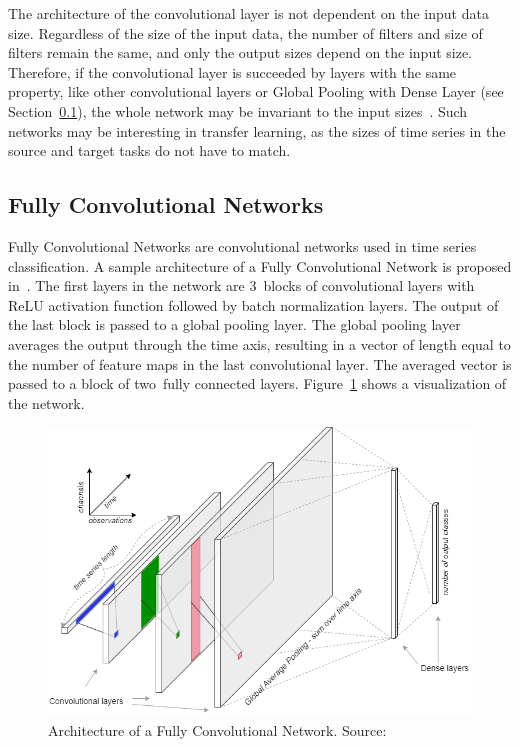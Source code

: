 \documentclass[a4paper,11pt,twoside]{report}
\theoremstyle{definition}
\begin{document}
The architecture of the convolutional layer is not dependent on the input data size. Regardless of the size of the input data, the number of filters and size of filters remain the same, and only the output sizes depend on the input size. Therefore, if the convolutional layer is succeeded by layers with the same property, like other convolutional layers or Global Pooling with Dense Layer (see Section~\ref{FCN}), the whole network may be invariant to the input sizes~\cite{dl_tsc}. Such networks may be interesting in transfer learning, as the sizes of time series in the source and target tasks do not have to match.

\subsection{Fully Convolutional Networks}\label{FCN}
Fully Convolutional Networks are convolutional networks used in time series classification. A sample architecture of a Fully Convolutional Network is proposed in~\cite{dl_tsc, tsc_scratch}. The first layers in the network are 3~blocks of convolutional layers with ReLU activation function followed by batch normalization layers. The output of the last block is passed to a global pooling layer. The global pooling layer averages the output through the time axis, resulting in a vector of length equal to the number of feature maps in the last convolutional layer. The averaged vector is passed to a block of two~fully connected layers. Figure~\ref{fig:FCN_img} shows a visualization of the network.



\FloatBarrier

\begin{figure}[h!]
\centering
\includegraphics[width=15.5cm]{imgs/fcn.png}
\caption{Architecture of a Fully Convolutional Network. Source:~\cite{dl_tsc}}
\label{fig:FCN_img}
\end{figure}
\end{document}
